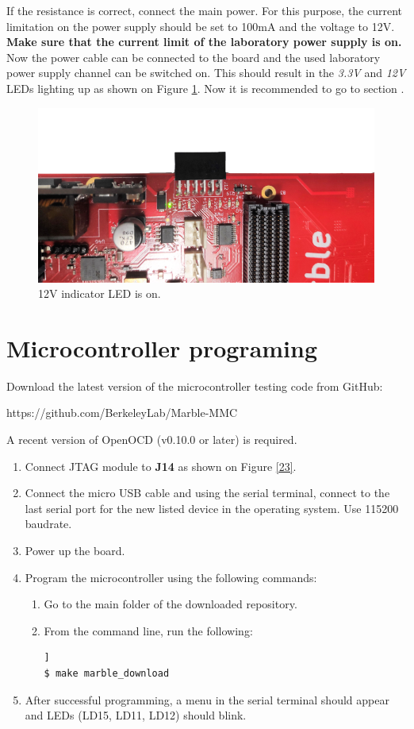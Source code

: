 \documentclass[12pt,oneside,a4]{article}
\begin{document}
If the resistance is correct, connect the main power. For this purpose, the current limitation on the power supply should be set to 100mA and the voltage to 12V. \textbf{Make sure that the current limit of the laboratory power supply is on.} Now the power cable can be connected to the board and the used laboratory power supply channel can be switched on.
This should result in the \textit{3.3V} and \textit{12V} LEDs lighting up as shown  on Figure \ref{02}. Now it is recommended to go to section .
\begin{figure}[H]
\begin{center}
\includegraphics[width=0.8\linewidth, angle = 180]{xrpoff.png}
 \caption{12V indicator LED is on. }\label{02}
\end{center}
\end{figure}

\section{Microcontroller programing}
\label{microcontroller}

Download the latest version of the microcontroller testing code from GitHub:
\begin{leftbar}
https://github.com/BerkeleyLab/Marble-MMC
\end{leftbar}

A recent version of OpenOCD (v0.10.0 or later) is required.
\begin{enumerate}
	\item Connect JTAG module to \textbf{J14} as shown on Figure \ref{23}.
	\item Connect the micro USB cable and using the serial terminal, connect to the last serial port for the new listed device in the operating system. Use 115200 baudrate.
	\item Power up the board.
	\item Program the microcontroller using the following commands:
	\begin{enumerate}
	\item Go to the main folder of the downloaded repository.
	\item From the command line, run the following:
	\begin{lstlisting}[backgroundcolor = \color{Gainsboro}, language=bash, frame=none]]
$ make marble_download
	\end{lstlisting}
	\end{enumerate}
	\item After successful programming, a menu in the serial terminal should appear and LEDs (LD15, LD11, LD12) should blink.
\end{enumerate}
\end{document}
